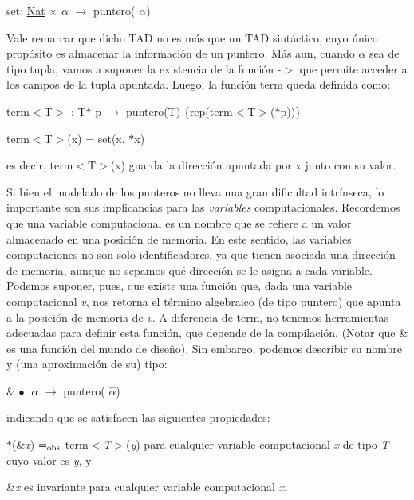 \begin{DoxyItemize}
\item set\-: \hyperlink{classNat}{\-Nat} $\times$ $\alpha$ $\to$ puntero( $\alpha$)
\end{DoxyItemize}

\-Vale remarcar que dicho \-T\-A\-D no es más que un \-T\-A\-D sintáctico, cuyo único propósito es almacenar la información de un puntero. \-Más aun, cuando $\alpha$ sea de tipo tupla, vamos a suponer la existencia de la función -\/$>$ que permite acceder a los campos de la tupla apuntada. \-Luego, la función term queda definida como\-:
\begin{DoxyItemize}
\item term$<$\-T$>$ \-: \-T$\ast$ p $\to$ puntero(\-T) \{rep(term$<$\-T$>$($\ast$p))\}
\item term$<$\-T$>$(x) = set(x, $\ast$x)
\end{DoxyItemize}

es decir, term$<$\-T$>$(x) guarda la dirección apuntada por x junto con su valor.

\-Si bien el modelado de los punteros no lleva una gran dificultad intrínseca, lo importante son sus implicancias para las {\itshape variables\/} computacionales. \-Recordemos que una variable computacional es un nombre que se refiere a un valor almacenado en una posición de memoria. \-En este sentido, las variables computaciones no son solo identificadores, ya que tienen asociada una dirección de memoria, aunque no sepamos qué dirección se le asigna a cada variable. \-Podemos suponer, pues, que existe una función que, dada una variable computacional {\itshape v\/}, nos retorna el término algebraico (de tipo puntero) que apunta a la posición de memoria de {\itshape v\/}. \-A diferencia de term, no tenemos herramientas adecuadas para definir esta función, que depende de la compilación. (\-Notar que \& es una función del mundo de diseño). \-Sin embargo, podemos describir su nombre y (una aproximación de su) tipo\-:
\begin{DoxyItemize}
\item \& $\bullet$\-: $\alpha$ $\to$ puntero( $\widehat{\alpha}$)
\end{DoxyItemize}

indicando que se satisfacen las siguientes propiedades\-:
\begin{DoxyEnumerate}
\item $\ast$(\&{\itshape x\/}) $=_{\rm obs}$ term$<${\itshape \-T$>$\/}({\itshape y\/}) para cualquier variable computacional {\itshape x\/} de tipo {\itshape \-T\/} cuyo valor es {\itshape y\/}, y
\item \&{\itshape x\/} es invariante para cualquier variable computacional {\itshape x\/}.
\end{DoxyEnumerate}

